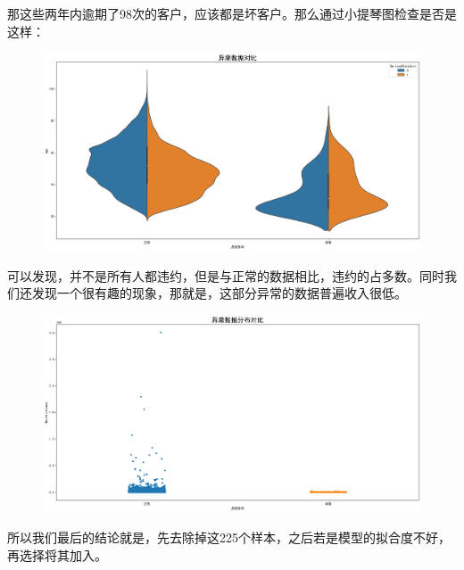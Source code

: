 \documentclass[12pt]{article}
\begin{document}
\newpage
\begin{flushleft}
	\noindent\qquad 那这些两年内逾期了98次的客户，应该都是坏客户。那么通过小提琴图检查是否是这样：
	
\end{flushleft}

\begin{figure}[H]
	\centering
	\includegraphics[width=1\linewidth]{figures/plot4}
	\caption{}
\end{figure}

\begin{flushleft}
	\noindent\qquad 可以发现，并不是所有人都违约，但是与正常的数据相比，违约的占多数。同时我们还发现一个很有趣的现象，那就是，这部分异常的数据普遍收入很低。
	
\end{flushleft}

\begin{figure}[H]
	\centering
	\includegraphics[width=1\linewidth]{figures/plot5}
	\caption{}
\end{figure}



\begin{flushleft}
	\noindent\qquad 所以我们最后的结论就是，先去除掉这225个样本，之后若是模型的拟合度不好，再选择将其加入。
	
\end{flushleft}
\end{document}
